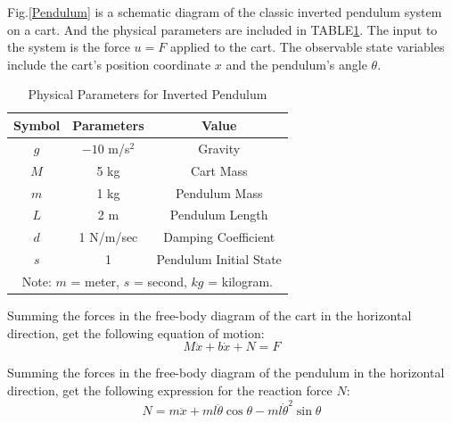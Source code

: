 \documentclass[journal,twoside,web]{ieeecolor}
\begin{document}
Fig.\ref{Pendulum} is a schematic diagram of the classic inverted pendulum system on a cart. And the physical parameters are included in TABLE\ref{tab:parameters}. The input to the system is the force \(u = F\) applied to the cart. The observable state variables include the cart's position coordinate \(x\) and the pendulum's angle \(\theta\).

\begin{table}[htb]
\caption{Physical Parameters for Inverted Pendulum}
\label{tab:parameters}
\setlength{\tabcolsep}{3pt}  %
\begin{tabular}{|c|c|c|}  %
\hline
Symbol & Parameters & Value \\
\hline
\hspace{5mm}$g$\hspace{5mm} & \(-10\) m/s\(^2\) & Gravity  \\
\hspace{5mm}$M$\hspace{5mm} & 5 kg & Cart Mass  \\  %
\hspace{5mm}$m$\hspace{5mm} & 1 kg & Pendulum Mass  \\
\hspace{5mm}$L$\hspace{5mm} & 2 m & Pendulum Length  \\

\hspace{5mm}$d$\hspace{5mm} & 1 N/m/sec & Damping Coefficient  \\
\hspace{5mm}$s$\hspace{5mm} & 1 & Pendulum Initial State  \\
\hline
\multicolumn{3}{p{240pt}}{Note: $m$ = meter, $s$ = second, $kg$ = kilogram.}  
\end{tabular}
\end{table}

Summing the forces in the free-body diagram of the cart in the horizontal direction,  get the following equation of motion:
\begin{equation}M\ddot{x}+b\dot{x}+N=F\label{eq1}\end{equation}

Summing the forces in the free-body diagram of the pendulum in the horizontal direction,  get the following expression for the reaction force $N$:
\begin{equation}N=m\ddot{x}+ml\ddot{\theta}\cos\theta-ml\dot{\theta}^2\sin\theta \label{eq2}\end{equation}
\end{document}
